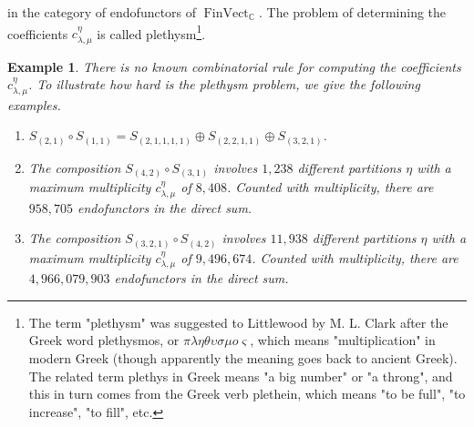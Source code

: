 \documentclass[11pt]{amsart}
\numberwithin{subsection}{section}
\numberwithin{figure}{section}
\numberwithin{table}{section}
\theoremstyle{1}
\theoremstyle{2}
\newtheorem{example}[theorem]{Example}
\DeclareMathOperator{\C}{\mathbb{C}}
\DeclareMathOperator{\FinVect}{FinVect}
\begin{document}
in the category of endofunctors of $\FinVect_{\C}$. The problem of determining the coefficients $c^{\eta}_{\lambda,\mu}$ is called plethysm\footnote{The term "plethysm" was suggested to Littlewood by M. L. Clark after the Greek word plethysmos, or $\pi\lambda\eta\theta\upsilon\sigma\mu o\varsigma$, which means "multiplication" in modern Greek (though apparently the meaning goes back to ancient Greek). The related term plethys in Greek means "a big number" or "a throng", and this in turn comes from the Greek verb plethein, which means "to be full", "to increase", "to fill", etc.}.
\begin{example}\label{ex_plethysm}
There is no known combinatorial rule for computing the coefficients $c^{\eta}_{\lambda,\mu}$. To illustrate how hard is the plethysm problem, we give the following examples.
\begin{enumerate}
\item $S_{(2,1)} \circ S_{(1,1)} = S_{(2, 1, 1, 1, 1)}\oplus S_{(2, 2, 1, 1)} \oplus S_{(3, 2, 1)}$.
\item The composition $S_{(4,2)} \circ S_{(3,1)}$ involves $1,238$ different partitions $\eta$ with a maximum multiplicity $c^{\eta}_{\lambda,\mu}$ of $8,408$. Counted with multiplicity, there are $958,705$ endofunctors in the direct sum.
\item The composition $S_{(3,2,1)} \circ S_{(4,2)}$ involves $11,938$ different partitions $\eta$ with a maximum multiplicity $c^{\eta}_{\lambda,\mu}$ of $9,496,674$. Counted with multiplicity, there are\\ $4,966,079,903$ endofunctors in the direct sum.
\end{enumerate}
\end{example}
\end{document}
